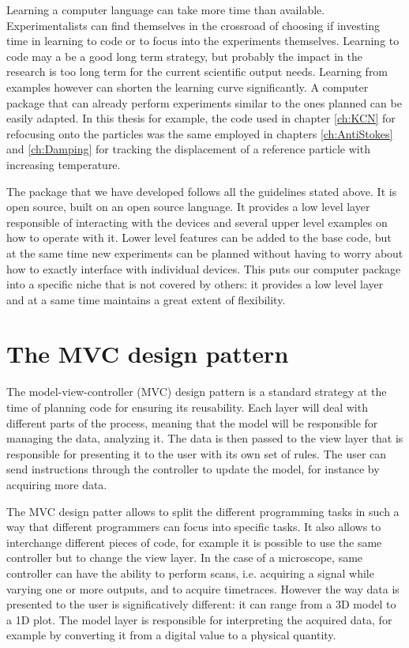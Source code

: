 Learning a computer language can take more time than available. Experimentalists
can find themselves in the crossroad of choosing if investing time in learning
to code or to focus into the experiments themselves. Learning to code may a be a
good long term strategy, but probably the impact in the research is too long
term for the current scientific output needs. Learning from examples however can
shorten the learning curve significantly. A computer package that can already
perform experiments similar to the ones planned can be easily adapted. In this
thesis for example, the code used in chapter \ref{ch:KCN} for refocusing onto
the particles was the same employed in chapters \ref{ch:AntiStokes} and
\ref{ch:Damping} for tracking the displacement of a reference particle with
increasing temperature. 

The package that we have developed follows all the guidelines stated above. It
is open source, built on an open source language. It provides a low level layer
responsible of interacting with the devices and several upper level examples on
how to operate with it. Lower level features can be added to the base code, but
at the same time new experiments can be planned without having to worry about
how to exactly interface with individual devices. This puts our computer package
into a specific niche that is not covered by others: it provides a low level
layer and at a same time maintains a great extent of flexibility. 

\section{The MVC design pattern}
The model-view-controller (MVC) design pattern is a standard strategy at the
time of planning code for ensuring its reusability. Each layer will deal with
different parts of the process, meaning that the model will be responsible for
managing the data, analyzing it. The data is then passed to the view layer that
is responsible for presenting it to the user with its own set of rules. The user
can send instructions through the controller to update the model, for instance
by acquiring more data. 

The MVC design patter allows to split the different programming tasks in such a
way that different programmers can focus into specific tasks. It also allows to
interchange different pieces of code, for example it is possible to use the same
controller but to change the view layer. In the case of a microscope, same
controller can have the ability to perform scans, i.e. acquiring a signal while
varying one or more outputs, and to acquire timetraces. However the way data is
presented to the user is significatively different: it can range from a 3D model
to a 1D plot. The model layer is responsible for interpreting the acquired data,
for example by converting it from a digital value to a physical quantity. 

